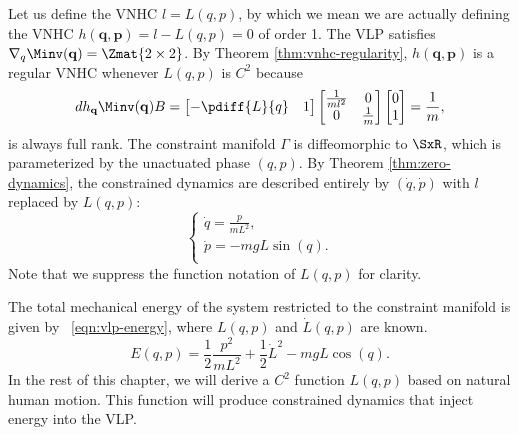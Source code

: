 Let us define the VNHC \(l = L(q,p)\), by which we mean we are
actually defining the VNHC \(h(\mathbf{q},\mathbf{p}) = l - L(q,p) = 0\) of
order 1.
The VLP satisfies
\(\nabla_q \Minv(\mathbf{q}) = \Zmat{2 \times 2}\).
By Theorem \ref{thm:vnhc-regularity},
\(h(\mathbf{q},\mathbf{p})\) is a regular VNHC whenever 
\(L(q,p)\) is \(C^2\) because
\[
   dh_{\mathbf{q}} \Minv(\mathbf{q})B = 
   \begin{bmatrix}
      -\pdiff{L}{q} & 1
   \end{bmatrix}
   \begin{bmatrix}
      \frac{1}{ml^2}  & 0 \\
      0 & \frac{1}{m}
   \end{bmatrix} 
   \begin{bmatrix}
      0 \\ 
      1
   \end{bmatrix}
   = \frac{1}{m}
   ,
\]
is always full rank.
The constraint manifold \(\Gamma\) is diffeomorphic to 
\(\SxR\), which is parameterized by the unactuated
phase \((q,p)\).
By Theorem \ref{thm:zero-dynamics}, the constrained dynamics
are described entirely by \((\dot{q},\dot{p})\) with \(l\)
replaced by \(L(q,p)\):
\begin{equation}\label{eqn:vlp-hamiltonian}
   \begin{cases}
      \dot{q} = \frac{p}{m L^2} 
      , \\
      \dot{p} = -mgL\sin(q)
      . \\ 
   \end{cases}
\end{equation}
Note that we suppress the function notation of \(L(q,p)\) for clarity.

The total mechanical energy of the system restricted to the constraint manifold
is given by ~\eqref{eqn:vlp-energy}, where \(L(q,p)\) and \(\dot{L}(q,p)\) are
known.
\begin{equation}\label{eqn:vlp-energy}
   E(q,p) = \frac{1}{2} \frac{p^2}{mL^2} + \frac{1}{2}\dot{L}^2 - mgL\cos(q)
   .
\end{equation}
In the rest of this chapter, we will derive a \(C^2\) function \(L(q,p)\) based
on natural human motion.
This function will produce constrained dynamics that inject energy into the VLP.

